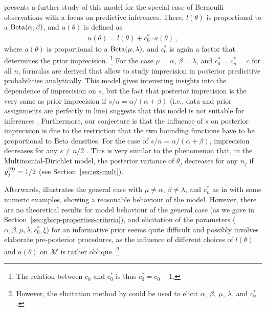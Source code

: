 \medskip

\textcite{1994:coolen} presents a further study of this model
for the special case of Bernoulli observations with a focus on predictive inferences.
There, $l(\theta)$ is proportional to a $\operatorname{Beta}(\alpha,\beta)$,
and $u(\theta)$ is defined as
\begin{align*}
u(\theta) = l(\theta) + c^*_0 \cdot a(\theta)\,,
\end{align*}
where $a(\theta)$ is proportional to a $\operatorname{Beta}(\mu,\lambda)$,
and $c^*_0$ is again a factor that determines the prior imprecision.%
\footnote{The relation between $c_0$ and $c^*_0$ is thus $c^*_0 = c_0 - 1$.}
For the case $\mu=\alpha$, $\beta=\lambda$, and $c^*_0 = c^*_n = c$ for all $n$,
formulas are derived that allow to study
imprecision in posterior predicitive probabilities analytically.
This model gives interesting insights into the dependence of imprecision on $s$,
but the fact that posterior imprecision is the very same as prior imprecision
if $s/n = \alpha/(\alpha+\beta)$ (i.e., data and prior assignments are perfectly in line)
suggests that this model is not suitable for inferences \parencite[p.~160]{1994:coolen}.
Furthermore, our conjecture is that the influence of $s$ on posterior imprecision
is due to the restriction that the two bounding functions have to be
proportional to Beta densities. For the case of $s/n = \alpha/(\alpha+\beta)$,
imprecision decreases for any $s \neq n/2$ \parencite[Table~1]{1994:coolen}.
This is very similar to the phenomenon that, in the Multinomial-Dirichlet model,
the posterior variance of $\theta_j$ decreases for any $n_j$ if $y^{(0)}_j = 1/2$
(see Section~\ref{sec:ex-mult}).

Afterwards, \textcite[\S 4]{1994:coolen} illustrates the general case
with $\mu\neq\alpha$, $\beta\neq\lambda$, and $c^*_n$ as in \textcite{1993:coolen}
with some numeric examples, showing a reasonable behaviour of the model.
However, there are no theoretical results for model behaviour of the general case
(as we gave in Section~\ref{sec:gbicp-properties-criteria}),
and elicitation of the parameters ($\alpha,\beta,\mu,\lambda,c^*_0,\xi$)
for an informative prior
seems quite difficult and possibly involves elaborate pre-posterior procedures,
as the influence of different choices of $l(\theta)$ and $a(\theta)$ on $\mathcal{M}$
is rather oblique.%
\footnote{However, the elicitation method by \textcite{2011:rinderknecht} could be used
to elicit $\alpha,\ \beta,\ \mu,\ \lambda$, and $c^*_0$.}

\medskip

